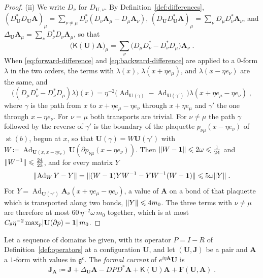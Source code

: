 \documentclass[11pt]{preprint}
\newcommand{\id}{\mathbf 1}
\newcommand{\Ad}{\operatorname{Ad}}
\DeclarePairedDelimiter{\abs}{\lvert}{\rvert}
\DeclarePairedDelimiter{\norm}{\lVert}{\rVert}
\numberwithin{equation}{section}
\begin{document}
\begin{proof}
(ii) We write $D_\nu$ for $D_{\mathbf U,\nu}$. By Definition~\ref{def:differences}, $(D^*_{\mathbf U}D_{\mathbf U}\mathbf A)_\mu = \sum_{\nu \neq \mu}D^*_\nu(D_\nu\mathbf A_\mu - D_\mu\mathbf A_\nu)$, $(D_{\mathbf U}D^*_{\mathbf U}\mathbf A)_\mu = \sum_\nu D_\mu D^*_\nu\mathbf A_\nu$, and $\Delta_{\mathbf U}\mathbf A_\mu = \sum_\nu D^*_\nu D_\nu\mathbf A_\mu$, so that
\[
    \bigl(\mathsf K(\mathbf U)\mathbf A\bigr)_\mu = \sum_\nu\bigl(D_\mu D^*_\nu - D^*_\nu D_\mu\bigr)\mathbf A_\nu\;.
\]
When \eqref{eq:forward-difference} and \eqref{eq:backward-difference} are applied to a $0$-form $\lambda$ in the two orders, the terms with $\lambda(x)$, $\lambda(x + \eta e_\mu)$, and $\lambda(x - \eta e_\nu)$ are the same, and
\[
    \bigl((D_\mu D^*_\nu - D^*_\nu D_\mu)\lambda\bigr)(x) = \eta^{-2}\bigl(\Ad_{\mathbf U(\gamma)} - \Ad_{\mathbf U(\gamma')}\bigr)\lambda(x + \eta e_\mu - \eta e_\nu)\;,
\]
where $\gamma$ is the path from $x$ to $x + \eta e_\mu - \eta e_\nu$ through $x + \eta e_\mu$ and $\gamma'$ the one through $x - \eta e_\nu$. For $\nu = \mu$ both transports are trivial. For $\nu \neq \mu$ the path $\gamma$ followed by the reverse of $\gamma'$ is the boundary of the plaquette $p_{\nu\mu}(x - \eta e_\nu)$ of $\operatorname{st}(b)$, begun at $x$, so that $\mathbf U(\gamma) = W\mathbf U(\gamma')$ with $W \coloneqq \Ad_{\mathbf U(x, x - \eta e_\nu)}\mathbf U(\partial p_{\nu\mu}(x - \eta e_\nu))$. Then $\norm{W - \id} \leqslant 2\omega \leqslant \frac{1}{24}$ and $\norm{W^{-1}} \leqslant \frac{24}{23}$, and for every matrix $Y$
\[
    \norm{\Ad_WY - Y} = \norm{(W - \id)YW^{-1} - YW^{-1}(W - \id)} \leqslant 5\omega\norm Y\;.
\]
For $Y = \Ad_{\mathbf U(\gamma')}\mathbf A_\nu(x + \eta e_\mu - \eta e_\nu)$, a value of $\mathbf A$ on a bond of that plaquette which is transported along two bonds, $\norm Y \leqslant 4m_0$. The three terms with $\nu \neq \mu$ are therefore at most $60\,\eta^{-2}\omega\,m_0$ together, which is at most $C_8\eta^{-2}\max_p\abs{\mathbf U(\partial p) - \id}\,m_0$.
\end{proof}

\begin{definition}\label{def:formal-current}
Let a sequence of domains be given, with its operator $P = I - R$ of Definition~\ref{def:operators} at a configuration $\mathbf U$, and let $(\mathbf U, \mathbf J)$ be a pair and $\mathbf A$ a $1$-form with values in $\mathfrak g^c$. The \emph{formal current} of $e^{i\eta\mathbf A}\mathbf U$ is
\begin{equation}\label{eq:formal-current}
    \mathbf J_{\mathbf A} \coloneqq \mathbf J + \Delta_{\mathbf U}\mathbf A - DPD^*\mathbf A + \mathsf K(\mathbf U)\mathbf A + \mathbf F(\mathbf U, \mathbf A)\;.
\end{equation}
\end{definition}
\end{document}
